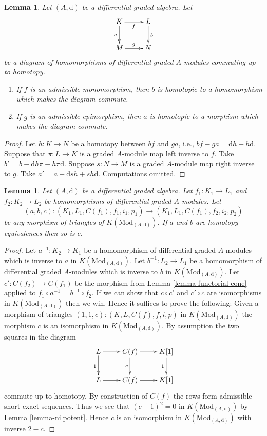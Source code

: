 \documentclass{stacks-project}
\theoremstyle{plain}
\newtheorem{lemma}[subsection]{Lemma}
\theoremstyle{definition}
\theoremstyle{remark}
\numberwithin{equation}{subsection}
\begin{document}
\begin{lemma}
\label{lemma-make-commute-map}
Let $(A, \text{d})$ be a differential graded algebra. Let
$$
\xymatrix{
K \ar[r]_f \ar[d]_a & L \ar[d]^b \\
M \ar[r]^g & N
}
$$
be a diagram of homomorphisms of differential graded $A$-modules
commuting up to homotopy.
\begin{enumerate}
\item If $f$ is an admissible monomorphism, then $b$ is homotopic to a
homomorphism which makes the diagram commute.
\item If $g$ is an admissible epimorphism, then $a$ is homotopic to a
morphism which makes the diagram commute.
\end{enumerate}
\end{lemma}

\begin{proof}
Let $h : K \to N$ be a homotopy between $bf$ and $ga$, i.e.,
$bf - ga = \text{d}h + h\text{d}$. Suppose that $\pi : L \to K$
is a graded $A$-module map left inverse to $f$. Take
$b' = b - \text{d}h\pi - h\pi \text{d}$.
Suppose $s : N \to M$ is a graded $A$-module map right inverse to $g$.
Take $a' = a + \text{d}sh + sh\text{d}$.
Computations omitted.
\end{proof}

\begin{lemma}
\label{lemma-third-isomorphism}
Let $(A, \text{d})$ be a differential graded algebra.
Let $f_1 : K_1 \to L_1$ and $f_2 : K_2 \to L_2$ be homomorphisms of
differential graded $A$-modules. Let
$$
(a, b, c) :
(K_1, L_1, C(f_1), f_1, i_1, p_1)
\longrightarrow
(K_1, L_1, C(f_1), f_2, i_2, p_2)
$$
be any morphism of triangles of $K(\text{Mod}_{(A, \text{d})})$.
If $a$ and $b$ are homotopy equivalences then so is $c$.
\end{lemma}

\begin{proof}
Let $a^{-1} : K_2 \to K_1$ be a homomorphism of differential graded $A$-modules
which is inverse to $a$ in $K(\text{Mod}_{(A, \text{d})})$.
Let $b^{-1} : L_2 \to L_1$ be a homomorphism of differential graded $A$-modules
which is inverse to $b$ in $K(\text{Mod}_{(A, \text{d})})$.
Let $c' : C(f_2) \to C(f_1)$ be the morphism from
Lemma \ref{lemma-functorial-cone} applied to
$f_1 \circ a^{-1} = b^{-1} \circ f_2$.
If we can show that $c \circ c'$ and $c' \circ c$ are isomorphisms in
$K(\text{Mod}_{(A, \text{d})})$
then we win. Hence it suffices to prove the following: Given
a morphism of triangles
$(1, 1, c) : (K, L, C(f), f, i, p)$
in $K(\text{Mod}_{(A, \text{d})})$ the morphism $c$ is an isomorphism
in $K(\text{Mod}_{(A, \text{d})})$.
By assumption the two squares in the diagram
$$
\xymatrix{
L \ar[r] \ar[d]_1 &
C(f) \ar[r] \ar[d]_c &
K[1] \ar[d]_1 \\
L \ar[r] &
C(f) \ar[r] &
K[1]
}
$$
commute up to homotopy. By construction of $C(f)$ the rows
form admissible short exact sequences. Thus we see that
$(c - 1)^2 = 0$ in $K(\text{Mod}_{(A, \text{d})})$ by
Lemma \ref{lemma-nilpotent}.
Hence $c$ is an isomorphism in $K(\text{Mod}_{(A, \text{d})})$
with inverse $2 - c$.
\end{proof}
\end{document}

